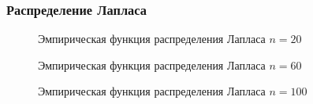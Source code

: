 \documentclass{article}
\begin{document}
\newpage
\subsubsection{Распределение Лапласа}

\begin{figure}[h]
\caption{Эмпирическая функция распределения Лапласа $n=20$}
\end{figure}

\begin{figure}[h]
\caption{Эмпирическая функция распределения Лапласа $n=60$}
\end{figure}

\begin{figure}[h]
\caption{Эмпирическая функция распределения Лапласа $n=100$}
\end{figure}
\end{document}
